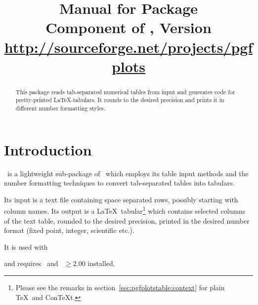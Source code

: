 \title{%
	Manual for Package \PGFPlotstable\\
	{\small Component of \PGFPlots, Version \pgfplotsversion}\\
	{\small\href{http://sourceforge.net/projects/pgfplots}{http://sourceforge.net/projects/pgfplots}}}


\maketitle
\begin{abstract}%
	This package reads tab-separated numerical tables from input and generates code for pretty-printed \LaTeX-tabulars. It rounds to the desired precision and prints it in different number formatting styles.
\end{abstract}
\tableofcontents
\section{Introduction}
\PGFPlotstable\ is a lightweight sub-package of \PGFPlots\ which employs its table input methods and the number formatting techniques to convert tab-separated tables into tabulars.

Its input is a text file containing space separated rows, possibly starting with column names. Its output is a \LaTeX\ tabular\footnote{Please see the remarks in section~\ref{sec:pgfplotstable:context} for plain \TeX\ and Con\TeX t.} which contains selected columns of the text table, rounded to the desired precision, printed in the desired number format (fixed point, integer, scientific etc.).

It is used with
\begin{codeexample}
\usepackage{pgfplotstable}
\end{codeexample}
\noindent and requires \PGFPlots\ and \PGF\ $ \ge 2.00$ installed.

